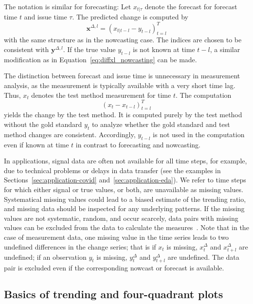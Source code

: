 \documentclass[pdflatex]{sn-jnl}
\theoremstyle{plain}%
\theoremstyle{definition}
\newcommand{\diffxl}{\mathbf{x}^{\Delta,l}}
\newcommand{\diffyl}{\mathbf{y}^{\Delta,l}}
\newcommand{\diffxt}[1][t]{x^{\Delta}_{#1}}
\newcommand{\diffyt}[1][t]{y^{\Delta}_{#1}}
\begin{document}
The notation is similar for forecasting: Let $x_{t | \tau}$ denote the forecast for forecast time $t$ and issue time $\tau$.
The predicted change is computed by
\begin{equation} \diffxl = (x_{t|t-l} - y_{t-l})^T_{t=l}\label{eq:diffxl_forecasting}
\end{equation}
with the same structure as in the nowcasting case.
The indices are chosen to be consistent with $\diffyl$.
If the true value $y_{t-l}$ is not known at time $t-l$, a similar modification as in Equation~\eqref{eq:diffxl_nowcasting} can be made.


The distinction between forecast and issue time is unnecessary in measurement analysis, as the measurement is typically available with a very short time lag.
Thus, $x_t$ denotes the test method measurement for time $t$.
The computation
\begin{equation}
  (x_{t} - x_{t-l})_{t=l}^T \label{eq:diffxl_measure}
\end{equation}
yields the change by the test method.
It is computed purely by the test method without the gold standard $y_t$ to analyze whether the gold standard and test method changes are consistent.
Accordingly, $y_{t-l}$ is not used in the computation even if known at time $t$ in contrast to forecasting and nowcasting.

In applications, signal data are often not available for all time steps, for example, due to technical problems or delays in data transfer (see the examples in Sections~\ref{sec:application-covid} and~\ref{sec:application-eda}).
We refer to time steps for which either signal or true values, or both, are unavailable as missing values.
Systematical missing values could lead to a biased estimate of the trending ratio, and missing data should be inspected for any underlying patterns.
If the missing values are not systematic, random, and occur scarcely, data pairs with missing values can be excluded from the data to calculate the measures~\parencite[see][Section 1.3]{VanBuuren2018}.
Note that in the case of measurement data, one missing value in the time series leads to two undefined differences in the change series; that is if $x_t$ is missing, $\diffxt$ and $\diffxt[t+l]$ are undefined; if an observation $y_t$ is missing, $\diffyt$ and $\diffyt[t+l]$ are undefined.
The data pair is excluded even if the corresponding nowcast or forecast is available.



\subsection{Basics of trending and four-quadrant plots}\label{subsec:trending-four-quadrant-plot}
\end{document}

